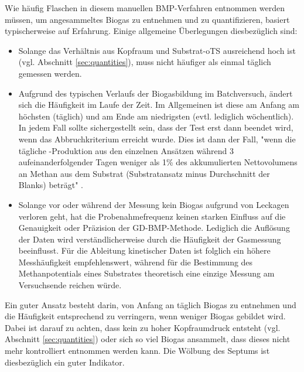 \documentclass[]{article}
\begin{document}
Wie häufig Flaschen in diesem manuellen BMP-Verfahren entnommen werden müssen, um angesammeltes Biogas zu entnehmen und zu quantifizieren, basiert typischerweise auf Erfahrung.
Einige allgemeine Überlegungen diesbezüglich sind:
\begin{itemize}
\item Solange das Verhältnis aus Kopfraum und Substrat-oTS ausreichend hoch ist (vgl. Abschnitt \ref{sec:quantities}), muss nicht häufiger als einmal täglich gemessen werden.
  \item Aufgrund des typischen Verlaufs der Biogasbildung im Batchversuch, ändert sich die Häufigkeit im Laufe der Zeit. Im Allgemeinen ist diese am Anfang am höchsten (täglich) und am Ende am niedrigsten (evtl. lediglich wöchentlich). In jedem Fall sollte sichergestellt sein, dass der Test erst dann beendet wird, wenn das Abbruchkriterium erreicht wurde. Dies ist dann der Fall, "wenn die tägliche -Produktion aus den einzelnen Ansätzen während 3 aufeinanderfolgender
Tagen weniger als 1\% des akkumulierten Nettovolumens an Methan aus dem Substrat (Substratansatz minus Durchschnitt der Blanks) beträgt" \citep{BMPdoc100req}.
  \item Solange vor oder während der Messung kein Biogas aufgrund von Leckagen verloren geht, hat die Probenahmefrequenz keinen starken Einfluss auf die Genauigkeit oder Präzision der GD-BMP-Methode. Lediglich die Auflösung der Daten wird verständlicherweise durch die Häufigkeit der Gasmessung beeinflusst. Für die Ableitung kinetischer Daten ist folglich ein höhere Messhäufigkeit empfehlenswert, während für die Bestimmung des Methanpotentials eines Substrates theoretisch eine einzige Messung am Versuchsende reichen würde.
\end{itemize}

Ein guter Ansatz besteht darin, von Anfang an täglich Biogas zu entnehmen und die Häufigkeit entsprechend zu verringern, wenn weniger Biogas gebildet wird. Dabei ist darauf zu achten, dass kein zu hoher Kopfraumdruck entsteht (vgl. Abschnitt \ref{sec:quantities}) oder sich so viel Biogas ansammelt, dass dieses nicht mehr kontrolliert entnommen werden kann. Die Wölbung des Septums ist diesbezüglich ein guter Indikator.
\end{document}
